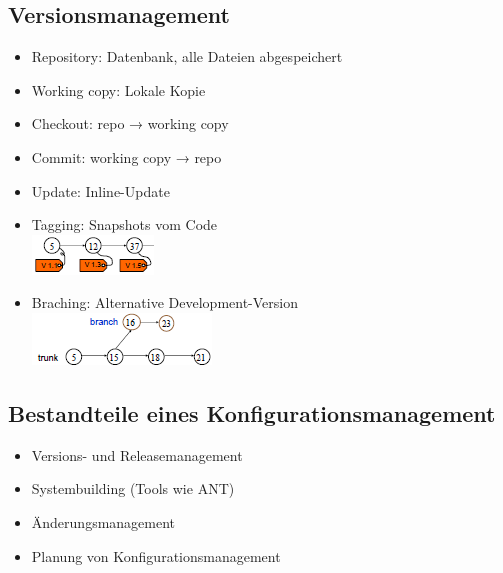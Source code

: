 \documentclass[a4paper,10pt]{article}
\begin{document}
\subsection{Versionsmanagement}
\begin{itemize}
 \item Repository: Datenbank, alle Dateien abgespeichert
 \item Working copy: Lokale Kopie
 \item Checkout: repo → working copy
 \item Commit: working copy → repo
 \item Update: Inline-Update
 \item Tagging: Snapshots vom Code\\
\includegraphics{tagging.png}
 \item Braching: Alternative Development-Version\\
\includegraphics{branching.png}
\end{itemize}

\subsection{Bestandteile eines Konfigurationsmanagement}
\begin{itemize}
 \item Versions- und Releasemanagement
 \item Systembuilding (Tools wie ANT)
 \item Änderungsmanagement
 \item Planung von Konfigurationsmanagement
\end{itemize}
\end{document}
